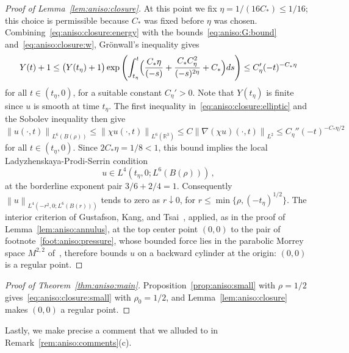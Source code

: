 \documentclass[11pt,reqno]{amsproc}
\numberwithin{equation}{section}
\theoremstyle{remark}
\newcommand{\RR}{\mathbb R}
\newcommand{\norm}[1]{\left\|#1\right\|}
\begin{document}
\begin{proof}[Proof of Lemma~\ref{lem:aniso:closure}]
At this point we fix $\eta=1/(16C_*)\le1/16$; this choice is permissible because $C_*$ was fixed before $\eta$ was chosen. Combining~\eqref{eq:aniso:closure:energy} with the bounds~\eqref{eq:aniso:G:bound} and~\eqref{eq:aniso:closure:w}, Gr\"onwall's inequality gives
\[
Y(t)+1\le\bigl(Y(t_\eta)+1\bigr)
\exp\left(\int_{t_\eta}^t\Bigl(\frac{C_*\eta}{(-s)}+\frac{C_*C_\eta^2}{(-s)^{2\eta}}+C_*\Bigr)ds\right)
\le C_\eta'(-t)^{-C_*\eta}
\]
for all $t\in(t_\eta,0)$, for a suitable constant $C_\eta'>0$. Note that $Y(t_\eta)$ is finite since $u$ is smooth at time $t_\eta$. The first inequality in~\eqref{eq:aniso:closure:elliptic} and the Sobolev inequality then give
\[
\norm{u(\cdot,t)}_{L^6(B(\rho))}
\le\norm{\chi u(\cdot,t)}_{L^6(\RR^3)}
\le C\norm{\nabla(\chi u)(\cdot,t)}_{L^2}
\le C_\eta''(-t)^{-C_*\eta/2}
\]
for all $t\in(t_\eta,0)$. Since $2C_*\eta=1/8<1$, this bound implies the local Ladyzhenskaya-Prodi-Serrin condition
\[
u\in L^4(t_\eta,0;L^6(B(\rho)))
\,,
\]
at the borderline exponent pair $3/6+2/4=1$. Consequently $\norm{u}_{L^4(-r^2,0;L^6(B(r)))}$ tends to zero as $r\downarrow0$, for $r\le\min\{\rho,(-t_\eta)^{1/2}\}$. The interior criterion of Gustafson, Kang, and Tsai~\cite[Theorem~1.1(i), with $p_*=6$ and $q=4$]{GKT07}, applied, as in the proof of Lemma~\ref{lem:aniso:annulus}, at the top center point $(0,0)$ to the pair of footnote~\ref{foot:aniso:pressure}, whose bounded force lies in the parabolic Morrey space $M^{2,2}$ of~\cite[Equation~(6)]{GKT07}, therefore bounds $u$ on a backward cylinder at the origin: $(0,0)$ is a regular point.
\end{proof}

\begin{proof}[Proof of Theorem~\ref{thm:aniso:main}]
Proposition~\ref{prop:aniso:small} with $\rho=1/2$ gives~\eqref{eq:aniso:closure:small} with $\rho_0=1/2$, and Lemma~\ref{lem:aniso:closure} makes $(0,0)$ a regular point.
\end{proof}

Lastly, we make precise a comment that we alluded to in Remark~\ref{rem:aniso:comments}(c).
\end{document}
